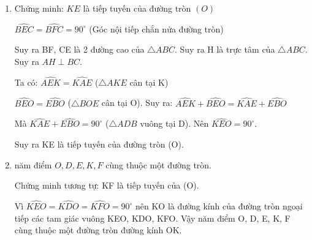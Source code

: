 \begin{ex}
{\begin{center}
			
		\end{center}
			\begin{enumerate}
			\item Chứng minh: $KE$ là tiếp tuyến của đường tròn $(O)$
			
			$\widehat{BEC} = \widehat{BFC} = 90^\circ$ (Góc nội tiếp chắn nửa đường tròn)
			
			Suy ra BF, CE là 2 đường cao của $\triangle ABC$. Suy ra H là trực tâm của $\triangle ABC$. Suy ra $AH \perp BC$.
			
			Ta có: $\widehat{AEK} = \widehat{KAE}$ ($\triangle AKE$ cân tại K)
			
			$\widehat{BEO} = \widehat{EBO}$ ($\triangle BOE$ cân tại O). Suy ra: $\widehat{AEK} + \widehat{BEO} = \widehat{KAE} + \widehat{EBO}$
			
			Mà $\widehat{KAE} + \widehat{EBO} = 90^\circ$ ($\triangle ADB$ vuông tại D). Nên $\widehat{KEO} = 90^\circ$.
			
			Suy ra KE là tiếp tuyến của đường tròn (O).
			\item năm điểm $O, D, E, K, F$ cùng thuộc một đường tròn.
			
			Chứng minh tương tự: KF là tiếp tuyến của (O).
			
			Vì $\widehat{KEO} = \widehat{KDO} = \widehat{KFO} = 90^\circ$ nên KO là đường kính của đường tròn ngoại tiếp các tam giác vuông KEO, KDO, KFO. Vậy năm điểm O, D, E, K, F cùng thuộc một đường tròn đường kính OK.
			
		\end{enumerate}
		}
\end{ex}


